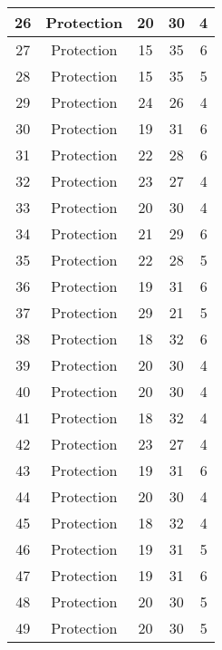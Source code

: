 \documentclass[results.tex]{subfiles}
\begin{document}
\begin{center}
\begin{tabular}{| c || c | c | c | c |}
    \hline
    26 & Protection & 20 & 30 & 4 \\ 
    \hline
    27 & Protection & 15 & 35 & 6 \\ 
    \hline
    28 & Protection & 15 & 35 & 5 \\ 
    \hline
    29 & Protection & 24 & 26 & 4 \\ 
    \hline
    30 & Protection & 19 & 31 & 6 \\ 
    \hline
    31 & Protection & 22 & 28 & 6 \\ 
    \hline
    32 & Protection & 23 & 27 & 4 \\ 
    \hline
    33 & Protection & 20 & 30 & 4 \\ 
    \hline
    34 & Protection & 21 & 29 & 6 \\ 
    \hline
    35 & Protection & 22 & 28 & 5 \\ 
    \hline
    36 & Protection & 19 & 31 & 6 \\ 
    \hline
    37 & Protection & 29 & 21 & 5 \\ 
    \hline
    38 & Protection & 18 & 32 & 6 \\ 
    \hline
    39 & Protection & 20 & 30 & 4 \\ 
    \hline
    40 & Protection & 20 & 30 & 4 \\ 
    \hline
    41 & Protection & 18 & 32 & 4 \\ 
    \hline
    42 & Protection & 23 & 27 & 4 \\ 
    \hline
    43 & Protection & 19 & 31 & 6 \\ 
    \hline
    44 & Protection & 20 & 30 & 4 \\ 
    \hline
    45 & Protection & 18 & 32 & 4 \\ 
    \hline
    46 & Protection & 19 & 31 & 5 \\ 
    \hline
    47 & Protection & 19 & 31 & 6 \\ 
    \hline
    48 & Protection & 20 & 30 & 5 \\ 
    \hline
    49 & Protection & 20 & 30 & 5 \\ 
    \hline   \end{tabular}
\end{center}
\end{document}
